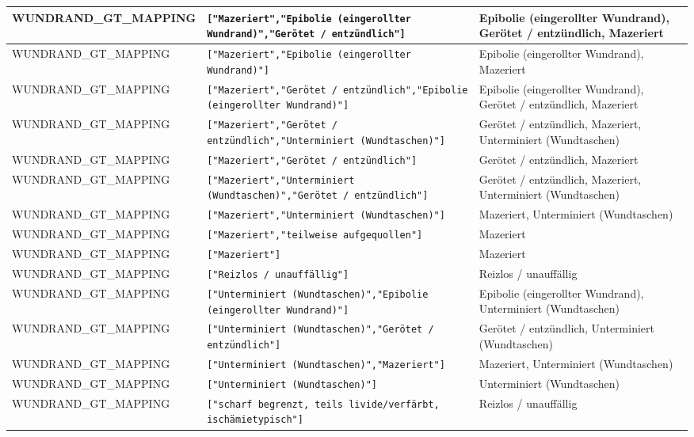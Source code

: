 \begin{longtable}{|p{3.5cm}|p{5cm}|p{6.5cm}|}
WUNDRAND\_GT\_MAPPING & \texttt{["Mazeriert","Epibolie (eingerollter Wundrand)","Gerötet / entzündlich"]} & Epibolie (eingerollter Wundrand), Gerötet / entzündlich, Mazeriert \\ \hline
WUNDRAND\_GT\_MAPPING & \texttt{["Mazeriert","Epibolie (eingerollter Wundrand)"]} & Epibolie (eingerollter Wundrand), Mazeriert \\ \hline
WUNDRAND\_GT\_MAPPING & \texttt{["Mazeriert","Gerötet / entzündlich","Epibolie (eingerollter Wundrand)"]} & Epibolie (eingerollter Wundrand), Gerötet / entzündlich, Mazeriert \\ \hline
WUNDRAND\_GT\_MAPPING & \texttt{["Mazeriert","Gerötet / entzündlich","Unterminiert (Wundtaschen)"]} & Gerötet / entzündlich, Mazeriert, Unterminiert (Wundtaschen) \\ \hline
WUNDRAND\_GT\_MAPPING & \texttt{["Mazeriert","Gerötet / entzündlich"]} & Gerötet / entzündlich, Mazeriert \\ \hline
WUNDRAND\_GT\_MAPPING & \texttt{["Mazeriert","Unterminiert (Wundtaschen)","Gerötet / entzündlich"]} & Gerötet / entzündlich, Mazeriert, Unterminiert (Wundtaschen) \\ \hline
WUNDRAND\_GT\_MAPPING & \texttt{["Mazeriert","Unterminiert (Wundtaschen)"]} & Mazeriert, Unterminiert (Wundtaschen) \\ \hline
WUNDRAND\_GT\_MAPPING & \texttt{["Mazeriert","teilweise aufgequollen"]} & Mazeriert \\ \hline
WUNDRAND\_GT\_MAPPING & \texttt{["Mazeriert"]} & Mazeriert \\ \hline
WUNDRAND\_GT\_MAPPING & \texttt{["Reizlos / unauffällig"]} & Reizlos / unauffällig \\ \hline
WUNDRAND\_GT\_MAPPING & \texttt{["Unterminiert (Wundtaschen)","Epibolie (eingerollter Wundrand)"]} & Epibolie (eingerollter Wundrand), Unterminiert (Wundtaschen) \\ \hline
WUNDRAND\_GT\_MAPPING & \texttt{["Unterminiert (Wundtaschen)","Gerötet / entzündlich"]} & Gerötet / entzündlich, Unterminiert (Wundtaschen) \\ \hline
WUNDRAND\_GT\_MAPPING & \texttt{["Unterminiert (Wundtaschen)","Mazeriert"]} & Mazeriert, Unterminiert (Wundtaschen) \\ \hline
WUNDRAND\_GT\_MAPPING & \texttt{["Unterminiert (Wundtaschen)"]} & Unterminiert (Wundtaschen) \\ \hline
WUNDRAND\_GT\_MAPPING & \texttt{["scharf begrenzt, teils livide/verfärbt, ischämietypisch"]} & Reizlos / unauffällig \\ \hline

\end{longtable}

